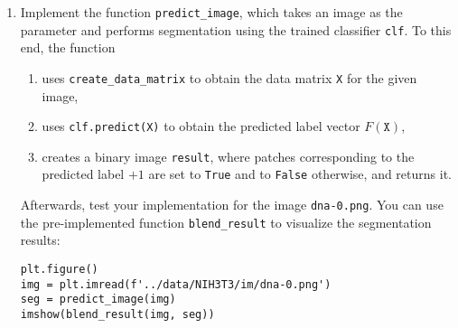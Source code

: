 \documentclass[12pt,a4paper]{article}
\begin{document}
\begin{enumerate}
\begin{enumerate}
    \end{enumerate}
    \item Implement the function \texttt{predict\_image}, which takes an image as the parameter and performs segmentation using the trained classifier \texttt{clf}. To this end, the function
    \begin{enumerate}
        \item uses \texttt{create\_data\_matrix} to obtain the data matrix \texttt{X} for the given image,
        \item uses \texttt{clf.predict(X)} to obtain the predicted label vector $F\left(\texttt{X}\right)$,
        \item creates a binary image \texttt{result}, where patches corresponding to the predicted label $+1$ are set to \texttt{True} and to \texttt{False} otherwise, and returns it.
    \end{enumerate}
    Afterwards, test your implementation for the image \texttt{dna-0.png}. You can use the pre-implemented function \texttt{blend\_result} to visualize the segmentation results:
\begin{Verbatim}[frame=single]
plt.figure()
img = plt.imread(f'../data/NIH3T3/im/dna-0.png')
seg = predict_image(img)
imshow(blend_result(img, seg))
\end{Verbatim}

\end{enumerate}
\end{document}
